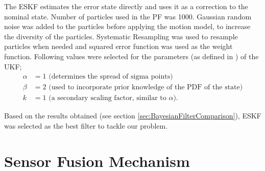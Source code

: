 The \gls{ESKF} estimates the error state directly and uses it as a correction to the nominal state. Number of particles used in the \gls{PF} was 1000. Gaussian random noise was added to the particles before applying the motion model, to increase the diversity of the particles. Systematic Resampling was used to resample particles when needed and squared error function was used as the weight function. Following values were selected for the parameters (as defined in \cite{ch26:wan2000unscented}) of the \gls{UKF};
\begin{align}
	\alpha &= 1 \text{ (determines the spread of sigma points)}\\
	\beta & = 2 \text{ (used to incorporate prior knowledge of the PDF of the state)}\\
	k &= 1 \text{ (a secondary scaling factor, similar to $\alpha$)}.
\end{align}

Based on the results obtained (see section \ref{sec:BayesianFilterComparison}), \gls{ESKF} was selected as the best filter to tackle our problem.









\section{Sensor Fusion Mechanism}
